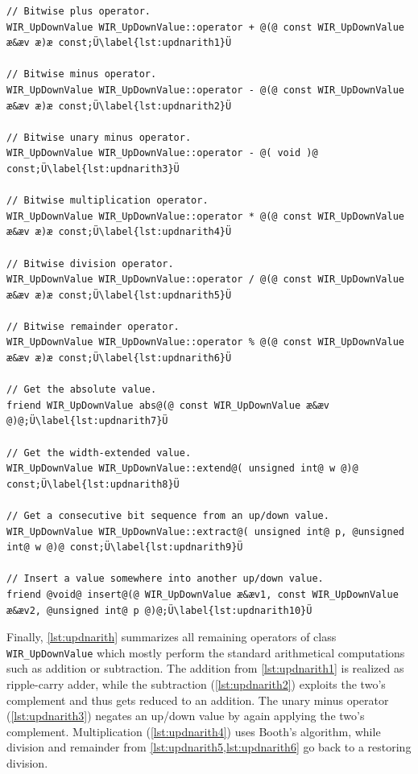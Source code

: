 \begin{lstlisting}[style=code,float=ht,caption={Arithmetical and Miscellaneous Operators of Class \texttt{WIR\_UpDownValue}},label=lst:updnarith]
// Bitwise plus operator.
WIR_UpDownValue WIR_UpDownValue::operator + @(@ const WIR_UpDownValue æ&æv æ)æ const;Ü\label{lst:updnarith1}Ü

// Bitwise minus operator.
WIR_UpDownValue WIR_UpDownValue::operator - @(@ const WIR_UpDownValue æ&æv æ)æ const;Ü\label{lst:updnarith2}Ü

// Bitwise unary minus operator.
WIR_UpDownValue WIR_UpDownValue::operator - @( void )@ const;Ü\label{lst:updnarith3}Ü

// Bitwise multiplication operator.
WIR_UpDownValue WIR_UpDownValue::operator * @(@ const WIR_UpDownValue æ&æv æ)æ const;Ü\label{lst:updnarith4}Ü

// Bitwise division operator.
WIR_UpDownValue WIR_UpDownValue::operator / @(@ const WIR_UpDownValue æ&æv æ)æ const;Ü\label{lst:updnarith5}Ü

// Bitwise remainder operator.
WIR_UpDownValue WIR_UpDownValue::operator % @(@ const WIR_UpDownValue æ&æv æ)æ const;Ü\label{lst:updnarith6}Ü

// Get the absolute value.
friend WIR_UpDownValue abs@(@ const WIR_UpDownValue æ&æv @)@;Ü\label{lst:updnarith7}Ü

// Get the width-extended value.
WIR_UpDownValue WIR_UpDownValue::extend@( unsigned int@ w @)@ const;Ü\label{lst:updnarith8}Ü

// Get a consecutive bit sequence from an up/down value.
WIR_UpDownValue WIR_UpDownValue::extract@( unsigned int@ p, @unsigned int@ w @)@ const;Ü\label{lst:updnarith9}Ü

// Insert a value somewhere into another up/down value.
friend @void@ insert@(@ WIR_UpDownValue æ&æv1, const WIR_UpDownValue æ&æv2, @unsigned int@ p @)@;Ü\label{lst:updnarith10}Ü
\end{lstlisting}

Finally, \cref{lst:updnarith} summarizes all remaining operators of class \texttt{WIR\_UpDownValue} which mostly perform the standard arithmetical computations such as addition or subtraction.
The addition from \cref{lst:updnarith1} is realized as ripple-carry adder, while the subtraction (\cref{lst:updnarith2}) exploits the two's complement and thus gets reduced to an addition.
The unary minus operator (\cref{lst:updnarith3}) negates an up/down value by again applying the two's complement.
Multiplication (\cref{lst:updnarith4}) uses Booth's algorithm, while division and remainder from \cref{lst:updnarith5,lst:updnarith6} go back to a restoring division.

